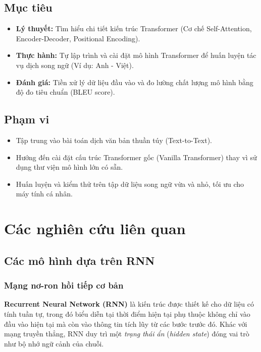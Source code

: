 \documentclass[a4paper,12pt,twoside]{report}
\begin{document}
\section{Mục tiêu}
\begin{itemize}
    \item \textbf{Lý thuyết:} Tìm hiểu chi tiết kiến trúc Transformer (Cơ chế Self-Attention, Encoder-Decoder, Positional Encoding).
    \item \textbf{Thực hành:} Tự lập trình và cài đặt mô hình Transformer để huấn luyện tác vụ dịch song ngữ (Ví dụ: Anh - Việt).
    \item \textbf{Đánh giá:} Tiền xử lý dữ liệu đầu vào và đo lường chất lượng mô hình bằng độ đo tiêu chuẩn (BLEU score).
\end{itemize}

\section{Phạm vi}
\begin{itemize}
    \item Tập trung vào bài toán dịch văn bản thuần túy (Text-to-Text).
    \item Hướng đến cài đặt cấu trúc Transformer gốc (Vanilla Transformer) thay vì sử dụng thư viện mô hình lớn có sẵn.
    \item Huấn luyện và kiểm thử trên tập dữ liệu song ngữ vừa và nhỏ, tối ưu cho máy tính cá nhân.
\end{itemize}

\chapter{Các nghiên cứu liên quan}
\section{Các mô hình dựa trên RNN}

\subsection{Mạng nơ-ron hồi tiếp cơ bản}

\textbf{Recurrent Neural Network (RNN)} là kiến trúc được thiết kế cho dữ liệu có tính tuần tự, trong đó biểu diễn tại thời điểm hiện tại phụ thuộc không chỉ vào đầu vào hiện tại mà còn vào thông tin tích lũy từ các bước trước đó. Khác với mạng truyền thẳng, RNN duy trì một \textit{trạng thái ẩn} (\textit{hidden state}) đóng vai trò như bộ nhớ ngữ cảnh của chuỗi.
\end{document}
